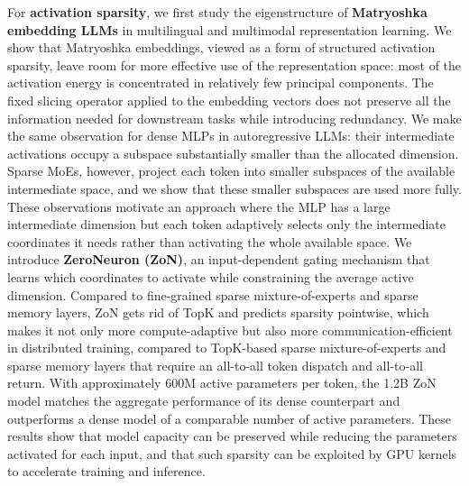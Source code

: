 For \textbf{activation sparsity}, we first study the eigenstructure of \textbf{Matryoshka
embedding LLMs} in multilingual and multimodal representation learning. We show
that Matryoshka embeddings, viewed as a form of structured activation sparsity,
leave room for more effective use of the representation space: most of the
activation energy is concentrated in relatively few principal components.
The fixed slicing operator applied to the embedding vectors
does not preserve all the information needed for downstream tasks while
introducing redundancy. We make the same observation for dense MLPs in
autoregressive LLMs: their intermediate activations occupy a subspace
substantially smaller than the allocated dimension. Sparse MoEs, however,
project each token into smaller subspaces of the available intermediate space,
and we show that these smaller subspaces are used more fully.
These observations motivate an approach where the MLP has a large intermediate
dimension but each token adaptively selects only the intermediate coordinates it needs
rather than activating the whole available space.
We introduce \textbf{ZeroNeuron (ZoN)}, an input-dependent
gating mechanism that learns which coordinates to activate while constraining the average active dimension.
Compared to fine-grained sparse mixture-of-experts and sparse memory layers,
ZoN gets rid of TopK and predicts sparsity pointwise, which
makes it not only more compute-adaptive but also more communication-efficient
in distributed training, compared to TopK-based sparse mixture-of-experts and
sparse memory layers that require an all-to-all token dispatch and all-to-all return.
With approximately 600M active parameters per
token, the 1.2B ZoN model matches the aggregate performance of its dense
counterpart and outperforms a dense model of a comparable number of active parameters.
These results show that model capacity can be preserved while reducing
the parameters activated for each input, and that such sparsity
can be exploited by GPU kernels to accelerate training and inference.

